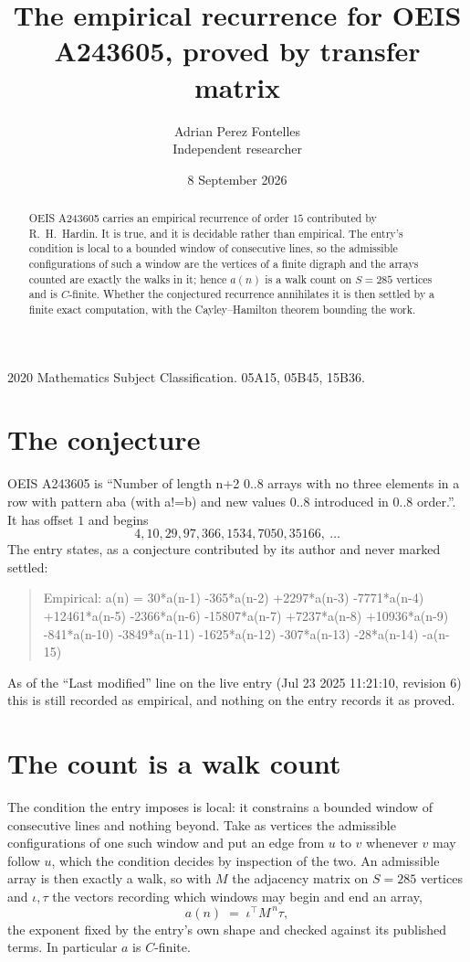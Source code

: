 \documentclass[11pt,a4paper]{article}
\title{The empirical recurrence for OEIS A243605, proved by transfer matrix}
\author{Adrian Perez Fontelles\\ \small Independent researcher}
\date{8 September 2026}
\theoremstyle{plain}
\theoremstyle{definition}
\begin{document}
\maketitle

\begin{abstract}
OEIS A243605 carries an empirical recurrence of order $15$ contributed by R.~H.~Hardin. It is
true, and it is decidable rather than empirical. The entry's condition is local to a bounded window of consecutive lines, so
the admissible configurations of such a window are the vertices of a finite digraph and the
arrays counted are exactly the walks in it; hence $a(n)$ is a walk count on $S=285$ vertices
and is $C$-finite. Whether the conjectured recurrence annihilates it is then settled by a
finite exact computation, with the Cayley--Hamilton theorem bounding the work.
\end{abstract}

\noindent\small 2020 Mathematics Subject Classification. 05A15, 05B45, 15B36.\normalsize

\section{The conjecture}

OEIS A243605 is ``Number of length n+2 0..8 arrays with no three elements in a row with pattern aba (with a!=b) and new values 0..8 introduced in 0..8 order.''. It has offset $1$ and begins
\[
4, 10, 29, 97, 366, 1534, 7050, 35166,\ \dots
\]
The entry states, as a conjecture contributed by its author and never marked settled:
\begin{quote}
Empirical: a(n) = 30*a(n-1) -365*a(n-2) +2297*a(n-3) -7771*a(n-4) +12461*a(n-5) -2366*a(n-6) -15807*a(n-7) +7237*a(n-8) +10936*a(n-9) -841*a(n-10) -3849*a(n-11) -1625*a(n-12) -307*a(n-13) -28*a(n-14) -a(n-15)
\end{quote}
As of the ``Last modified'' line on the live entry (Jul 23 2025 11:21:10, revision 6) this is still
recorded as empirical, and nothing on the entry records it as proved.

\section{The count is a walk count}

The condition the entry imposes is local: it constrains a bounded window of consecutive lines and nothing beyond. Take as
vertices the admissible configurations of one such window and put an edge from $u$ to $v$
whenever $v$ may follow $u$, which the condition decides by inspection of the two. An
admissible array is then exactly a walk, so with $M$ the adjacency matrix on $S=285$ vertices
and $\iota,\tau$ the vectors recording which windows may begin and end an array,
\[
a(n)\;=\;\iota^{\!\top}M^{\,n}\tau ,
\]
the exponent fixed by the entry's own shape and checked against its published terms. In
particular $a$ is $C$-finite.
\end{document}

